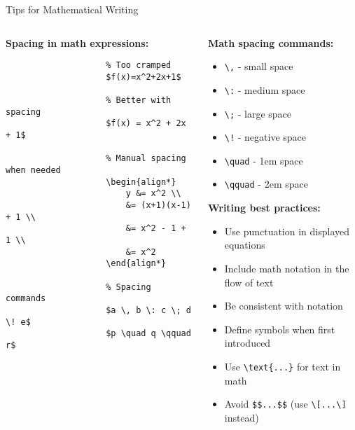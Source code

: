 	\begin{frame}[fragile]{Tips for Mathematical Writing}
		\begin{columns}
			\begin{column}{0.5\textwidth}
				\textbf{Spacing in math expressions:}
				
				\begin{lstlisting}
					% Too cramped
					$f(x)=x^2+2x+1$
					
					% Better with spacing
					$f(x) = x^2 + 2x + 1$
					
					% Manual spacing when needed
					\begin{align*}
						y &= x^2 \\
						&= (x+1)(x-1) + 1 \\
						&= x^2 - 1 + 1 \\
						&= x^2
					\end{align*}
					
					% Spacing commands
					$a \, b \: c \; d \! e$
					$p \quad q \qquad r$
				\end{lstlisting}
			\end{column}
			
			\begin{column}{0.5\textwidth}
				\textbf{Math spacing commands:}
				\begin{itemize}
					\item \texttt{\textbackslash,} - small space
					\item \texttt{\textbackslash:} - medium space
					\item \texttt{\textbackslash;} - large space
					\item \texttt{\textbackslash!} - negative space
					\item \texttt{\textbackslash quad} - 1em space
					\item \texttt{\textbackslash qquad} - 2em space
				\end{itemize}
				
				\textbf{Writing best practices:}
				\begin{itemize}
					\item Use punctuation in displayed equations
					\item Include math notation in the flow of text
					\item Be consistent with notation
					\item Define symbols when first introduced
					\item Use \texttt{\textbackslash text\{...\}} for text in math
					\item Avoid \texttt{\$\$...\$\$} (use \texttt{\textbackslash[...\textbackslash]} instead)
				\end{itemize}
			\end{column}
		\end{columns}
	\end{frame}
	
